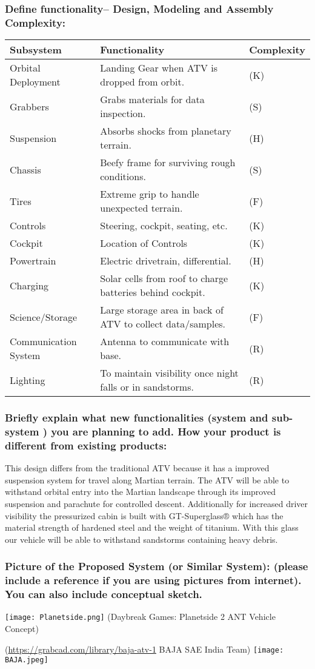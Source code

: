 \subsubsection{Define functionality– Design, Modeling and Assembly Complexity:}

\begin{center}
\begin{tabular}{lll}
\hline
Subsystem & Functionality & Complexity\\
\hline
Orbital Deployment & Landing Gear when ATV is dropped from orbit. & (K)\\
Grabbers & Grabs materials for data inspection. & (S)\\
Suspension & Absorbs shocks from planetary terrain. & (H)\\
Chassis & Beefy frame for surviving rough conditions. & (S)\\
Tires & Extreme grip to handle unexpected terrain. & (F)\\
Controls & Steering, cockpit, seating, etc. & (K)\\
Cockpit & Location of Controls & (K)\\
Powertrain & Electric drivetrain, differential. & (H)\\
Charging & Solar cells from roof to charge batteries behind cockpit. & (K)\\
Science/Storage & Large storage area in back of ATV to collect data/samples. & (F)\\
Communication System & Antenna to communicate with base. & (R)\\
Lighting & To maintain visibility once night falls or in sandstorms. & (R)\\
\hline
\end{tabular}
\end{center}
\subsubsection{Briefly explain what new functionalities (system and sub-system ) you are planning to add. How your product is different from existing products:}

This design differs from the traditional ATV because it has a improved suspension system for travel along Martian terrain. The ATV will be able to withstand orbital entry into the Martian landscape through its improved suspension and parachute for controlled descent. Additionally for increased driver visibility the pressurized cabin is built with GT-Superglass® which has the material strength of hardened steel and the weight of titanium. With this glass our vehicle will be able to withstand sandstorms containing heavy debris.  

\subsubsection{Picture of  the Proposed System (or Similar System): (please include a reference if you are using pictures from internet). You can also include conceptual sketch.}

\texttt{[image: Planetside.png]}
(Daybreak Games: Planetside 2 ANT Vehicle Concept)

(\url{https://grabcad.com/library/baja-atv-1} BAJA SAE India Team)
\texttt{[image: BAJA.jpeg]}